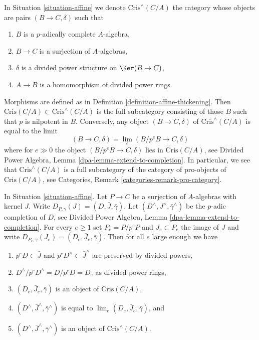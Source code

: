\begin{remark}
\label{remark-completed-affine-site}
In Situation \ref{situation-affine} we denote
$\text{Cris}^\wedge(C/A)$ the category whose objects are
pairs $(B \to C, \delta)$ such that
\begin{enumerate}
\item $B$ is a $p$-adically complete $A$-algebra,
\item $B \to C$ is a surjection of $A$-algebras,
\item $\delta$ is a divided power structure on $\Ker(B \to C)$,
\item $A \to B$ is a homomorphism of divided power rings.
\end{enumerate}
Morphisms are defined as in Definition \ref{definition-affine-thickening}.
Then $\text{Cris}(C/A) \subset \text{Cris}^\wedge(C/A)$ is the full
subcategory consisting of those $B$ such that $p$ is nilpotent in $B$.
Conversely, any object $(B \to C, \delta)$ of $\text{Cris}^\wedge(C/A)$
is equal to the limit
$$
(B \to C, \delta) = \lim_e (B/p^eB \to C, \delta)
$$
where for $e \gg 0$ the object $(B/p^eB \to C, \delta)$ lies
in $\text{Cris}(C/A)$, see
Divided Power Algebra, Lemma \ref{dpa-lemma-extend-to-completion}.
In particular, we see that $\text{Cris}^\wedge(C/A)$ is a full subcategory
of the category of pro-objects of $\text{Cris}(C/A)$, see
Categories, Remark \ref{categories-remark-pro-category}.
\end{remark}

\begin{lemma}
\label{lemma-list-properties}
In Situation \ref{situation-affine}.
Let $P \to C$ be a surjection of $A$-algebras with kernel $J$.
Write $D_{P, \gamma}(J) = (D, \bar J, \bar\gamma)$.
Let $(D^\wedge, J^\wedge, \bar\gamma^\wedge)$ be the
$p$-adic completion of $D$, see
Divided Power Algebra, Lemma \ref{dpa-lemma-extend-to-completion}.
For every $e \geq 1$ set $P_e = P/p^eP$ and $J_e \subset P_e$
the image of $J$ and write
$D_{P_e, \gamma}(J_e) = (D_e, \bar J_e, \bar\gamma)$.
Then for all $e$ large enough we have
\begin{enumerate}
\item $p^eD \subset \bar J$ and $p^eD^\wedge \subset \bar J^\wedge$
are preserved by divided powers,
\item $D^\wedge/p^eD^\wedge = D/p^eD = D_e$ as divided power rings,
\item $(D_e, \bar J_e, \bar\gamma)$ is an object of $\text{Cris}(C/A)$,
\item $(D^\wedge, \bar J^\wedge, \bar\gamma^\wedge)$ is equal to
$\lim_e (D_e, \bar J_e, \bar\gamma)$, and
\item $(D^\wedge, \bar J^\wedge, \bar\gamma^\wedge)$ is an object of
$\text{Cris}^\wedge(C/A)$.
\end{enumerate}
\end{lemma}

